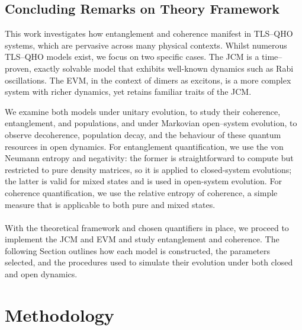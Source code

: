 \documentclass[11pt]{article}
\begin{document}
\subsection{Concluding Remarks on Theory Framework}

This work investigates how entanglement and coherence manifest in TLS--QHO systems, which are pervasive across many physical contexts. Whilst numerous TLS--QHO models exist, we focus on two specific cases. The JCM is a time--proven, exactly solvable model that exhibits well-known dynamics such as Rabi oscillations. The EVM, in the context of dimers as excitons, is a more complex system with richer dynamics, yet retains familiar traits of the JCM.

We examine both models under unitary evolution, to study their coherence, entanglement, and populations, and under Markovian open--system evolution, to observe decoherence, population decay, and the behaviour of these quantum resources in open dynamics. For entanglement quantification, we use the von Neumann entropy and negativity: the former is straightforward to compute but restricted to pure density matrices, so it is applied to closed-system evolutions; the latter is valid for mixed states and is used in open-system evolution. For coherence quantification, we use the relative entropy of coherence, a simple measure that is applicable to both pure and mixed states.\\
\\
With the theoretical framework and chosen quantifiers in place, we proceed to implement the JCM and EVM and study entanglement and coherence. The following Section outlines how each model is constructed, the parameters selected, and the procedures used to simulate their evolution under both closed and open dynamics. 
\newpage
\section{Methodology} \label{sec:method}
\end{document}
